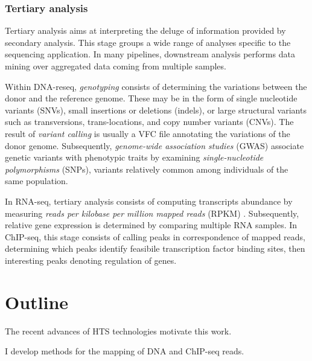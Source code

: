 \subsubsection{Tertiary analysis}

Tertiary analysis aims at interpreting the deluge of information provided by secondary analysis.
This stage groups a wide range of analyses specific to the sequencing application.
In many pipelines, downstream analysis performs data mining over aggregated data coming from multiple samples.

Within DNA-reseq, \emph{genotyping} consists of determining the variations between the donor and the reference genome.
These may be in the form of single nucleotide variants (SNVs), small insertions or deletions (indels), or large structural variants such as transversions, trans-locations, and copy number variants (CNVs).
The result of \emph{variant calling} is usually a VFC file annotating the variations of the donor genome.
Subsequently, \emph{genome-wide association studies} (GWAS) associate genetic variants with phenotypic traits by examining \emph{single-nucleotide polymorphisms} (SNPs), variants relatively common among individuals of the same population.

In RNA-seq, tertiary analysis consists of computing transcripts abundance by measuring \emph{reads per kilobase per million mapped reads} (RPKM) \citep{rnaseq}.
Subsequently, relative gene expression is determined by comparing multiple RNA samples.
In ChIP-seq, this stage consists of calling peaks in correspondence of mapped reads, determining which peaks identify feasibile transcription factor binding sites, then interesting peaks denoting regulation of genes.


\section{Outline}

The recent advances of HTS technologies motivate this work.

I develop methods for the mapping of DNA and ChIP-seq reads.
